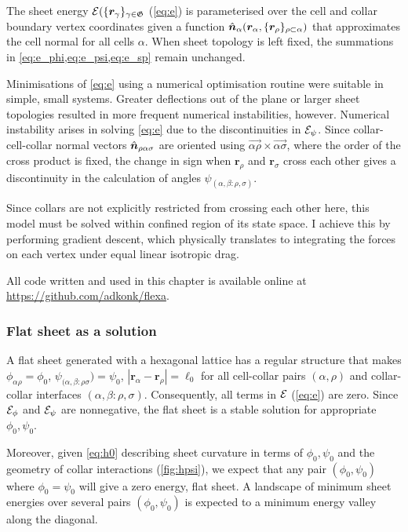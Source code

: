 The sheet energy $\mathcal{E}(\{\bm{r}_\gamma \}_{\gamma \in \mathfrak{G}}$ (\cref{eq:e}) is parameterised over the cell and collar boundary vertex coordinates given a function $\hat{\bm{n}}_\alpha(\bm{r}_\alpha, \{\bm{r}_\rho \}_{\rho\subset\alpha})$ that approximates the cell normal for all cells $\alpha$.
When sheet topology is left fixed, the summations in \cref{eq:e_phi,eq:e_psi,eq:e_sp} remain unchanged.

Minimisations of \cref{eq:e} using a numerical optimisation routine were suitable in simple, small systems. 
Greater deflections out of the plane or larger sheet topologies resulted in more frequent numerical instabilities, however.
Numerical instability arises in solving \cref{eq:e} due to the discontinuities in $\mathcal{E}_\psi$. 
Since collar-cell-collar normal vectors $\hat{\bm{n}}_{\rho\alpha\sigma}$ are oriented using $\vec{\alpha\rho} \times\vec{\alpha\sigma}$, where the order of the cross product is fixed, the change in sign when $\bm{r}_\rho$ and $\bm{r}_\sigma$ cross each other gives a discontinuity in the calculation of angles $\psi_{(\alpha,\beta:\rho,\sigma)}$. 

Since collars are not explicitly restricted from crossing each other here, this model must be solved within confined region of its state space.
I achieve this by performing gradient descent, which physically translates to integrating the forces on each vertex under equal linear isotropic drag.

All code written and used in this chapter is available online at \url{https://github.com/adkonk/flexa}.

\subsubsection{Flat sheet as a solution} \label{subsubsec:flat}

A flat sheet generated with a hexagonal lattice has a regular structure that makes $\phi_{\alpha\rho} = \phi_0$, $\psi_{(\alpha,\beta:\rho\sigma}) = \psi_0$, $|\bm{r}_\alpha - \bm{r}_\rho| = \ell_0$ for all cell-collar pairs $(\alpha,\rho)$ and collar-collar interfaces $(\alpha,\beta:\rho,\sigma)$. 
Consequently, all terms in $\mathcal{E}$ (\cref{eq:e}) are zero.
Since $\mathcal{E}_\phi$ and $\mathcal{E}_\psi$ are nonnegative, the flat sheet is a stable solution for appropriate $\phi_0, \psi_0$. 

Moreover, given \cref{eq:h0} describing sheet curvature in terms of $\phi_0, \psi_0$ and the geometry of collar interactions (\cref{fig:hpsi}), we expect that any pair $(\phi_0, \psi_0)$ where $\phi_0 = \psi_0$ will give a zero energy, flat sheet.
A landscape of minimum sheet energies over several pairs $(\phi_0, \psi_0)$ is expected to a minimum energy valley along the diagonal.

